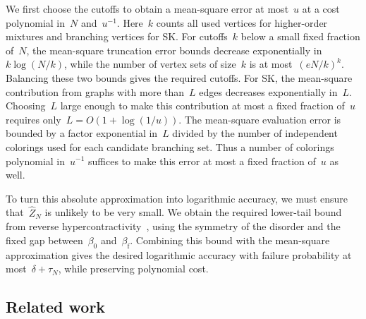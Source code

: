 \documentclass[letterpaper,11pt,reqno]{amsart}
\makeatletter
\renewcommand{\paragraph}[1]{\if@noskipsec\leavevmode\fi\par\addvspace{.5\baselineskip plus .2\baselineskip}\noindent{\normalfont\bfseries #1}\hspace{.5em}\ignorespaces}
\makeatother
\begin{document}
\paragraph{Completing the proof.} We first choose the cutoffs to obtain a mean-square error at most~$u$ at a cost polynomial in~$N$ and~$u^{-1}$. Here~$k$ counts all used vertices for higher-order mixtures and branching vertices for SK. For cutoffs~$k$ below a small fixed fraction of~$N$, the mean-square truncation error bounds decrease exponentially in~$k\log(N/k)$, while the number of vertex sets of size~$k$ is at most~$(eN/k)^k$. Balancing these two bounds gives the required cutoffs. For SK, the mean-square contribution from graphs with more than~$L$ edges decreases exponentially in~$L$. Choosing~$L$ large enough to make this contribution at most a fixed fraction of~$u$ requires only~$L=O(1+\log(1/u))$. The mean-square evaluation error is bounded by a factor exponential in~$L$ divided by the number of independent colorings used for each candidate branching set. Thus a number of colorings polynomial in~$u^{-1}$ suffices to make this error at most a fixed fraction of~$u$ as well.

To turn this absolute approximation into logarithmic accuracy, we must ensure that~$\widehat Z_N$ is unlikely to be very small. We obtain the required lower-tail bound from reverse hypercontractivity~\cite{MOS13}, using the symmetry of the disorder and the fixed gap between~$\beta_0$ and~$\beta_{\mathrm f}$. Combining this bound with the mean-square approximation gives the desired logarithmic accuracy with failure probability at most~$\delta+\tau_N$, while preserving polynomial cost.

\subsection{Related work}\label{subsec:related-work}

\end{document}
